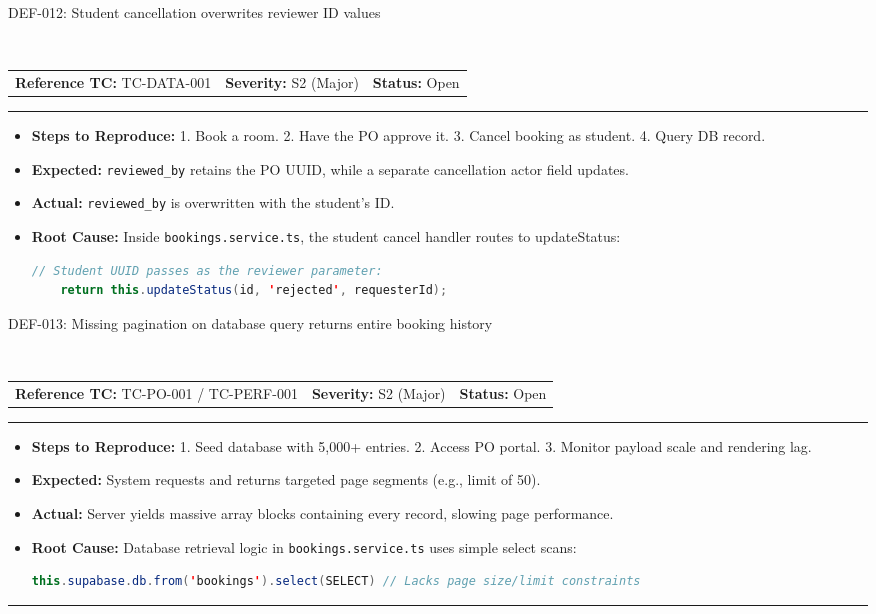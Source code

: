 \documentclass[11pt,a4paper]{article}
\makeatletter
\newcommand{\defectheader}[5]{%
    \needspace{6\baselineskip}
    \noindent\colorbox{primaryblue}{\parbox{\dimexpr\textwidth-2\fboxsep\relax}{
        \color{white}\bfseries\large\strut #1: #2
    }}
    \nopagebreak\\
    \noindent\begin{tabularx}{\textwidth}{@{}X X X@{}}
        \textbf{Reference TC:} #3 & \textbf{Severity:} #4 & \textbf{Status:} #5 \\
    \end{tabularx}
    \nopagebreak\vspace{0.1cm}
    \nopagebreak\hrule\vspace{0.2cm}
}
\makeatother
\begin{document}
\defectheader{DEF-012}{Student cancellation overwrites reviewer ID values}{TC-DATA-001}{S2 (Major)}{Open}
\begin{itemize}[noitemsep,topsep=1pt,leftmargin=0.5cm]
    \item \textbf{Steps to Reproduce:} 
    1. Book a room. 2. Have the PO approve it. 3. Cancel booking as student. 4. Query DB record.
    \item \textbf{Expected:} \texttt{reviewed\_by} retains the PO UUID, while a separate cancellation actor field updates.
    \item \textbf{Actual:} \texttt{reviewed\_by} is overwritten with the student's ID.
    \item \textbf{Root Cause:} Inside \texttt{bookings.service.ts}, the student cancel handler routes to updateStatus:
    \begin{lstlisting}[language=Java]
    // Student UUID passes as the reviewer parameter:
    return this.updateStatus(id, 'rejected', requesterId); 
    \end{lstlisting}
\end{itemize}

\newpage

\defectheader{DEF-013}{Missing pagination on database query returns entire booking history}{TC-PO-001 / TC-PERF-001}{S2 (Major)}{Open}
\begin{itemize}[noitemsep,topsep=1pt,leftmargin=0.5cm]
    \item \textbf{Steps to Reproduce:} 
    1. Seed database with 5,000+ entries. 2. Access PO portal. 3. Monitor payload scale and rendering lag.
    \item \textbf{Expected:} System requests and returns targeted page segments (e.g., limit of 50).
    \item \textbf{Actual:} Server yields massive array blocks containing every record, slowing page performance.
    \item \textbf{Root Cause:} Database retrieval logic in \texttt{bookings.service.ts} uses simple select scans:
    \begin{lstlisting}[language=Java]
    this.supabase.db.from('bookings').select(SELECT) // Lacks page size/limit constraints
    \end{lstlisting}
\end{itemize}

\vspace{0.4cm}\hrule\vspace{0.4cm}
\end{document}
